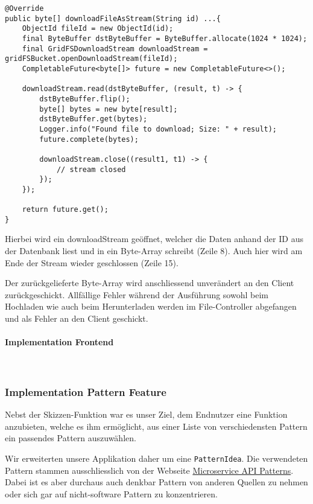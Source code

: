 \begin{lstlisting}[caption={Download File im DB Service}, label=uploadFileDBService]
@Override
public byte[] downloadFileAsStream(String id) ...{
    ObjectId fileId = new ObjectId(id);
    final ByteBuffer dstByteBuffer = ByteBuffer.allocate(1024 * 1024);
    final GridFSDownloadStream downloadStream = gridFSBucket.openDownloadStream(fileId);
    CompletableFuture<byte[]> future = new CompletableFuture<>();

    downloadStream.read(dstByteBuffer, (result, t) -> {
        dstByteBuffer.flip();
        byte[] bytes = new byte[result];
        dstByteBuffer.get(bytes);
        Logger.info("Found file to download; Size: " + result);
        future.complete(bytes);

        downloadStream.close((result1, t1) -> {
            // stream closed
        });
    });

    return future.get();
}
\end{lstlisting}

Hierbei wird ein downloadStream geöffnet, welcher die Daten anhand der ID aus der Datenbank liest und in ein Byte-Array schreibt (Zeile 8). Auch hier wird am Ende der Stream wieder geschlossen (Zeile 15).

Der zurückgelieferte Byte-Array wird anschliessend unverändert an den Client zurückgeschickt. Allfällige Fehler während der Ausführung sowohl beim Hochladen wie auch beim Herunterladen werden im File-Controller abgefangen und als Fehler an den Client geschickt.

\paragraph*{Implementation Frontend}~\\

\subsubsection{Implementation Pattern Feature}
Nebst der Skizzen-Funktion war es unser Ziel, dem Endnutzer eine Funktion anzubieten, welche es ihm ermöglicht, aus einer Liste von verschiedensten Pattern ein passendes Pattern auszuwählen. 

Wir erweiterten unsere Applikation daher um eine \texttt{PatternIdea}. Die verwendeten Pattern stammen ausschliesslich von der Webseite \href{https://microservice-api-patterns.org}{Microservice API Patterns}. Dabei ist es aber durchaus auch denkbar Pattern von anderen Quellen zu nehmen oder sich gar auf nicht-software Pattern zu konzentrieren.

